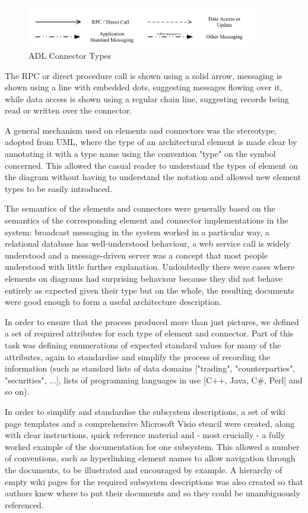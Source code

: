 \begin{figure}
\centering
\includegraphics[width=10cm]{Figures/adls-figure3}
\caption{ADL Connector Types}
\label{figure:adlconnectortypes}
\end{figure}  


  The RPC or direct procedure call is shown using a solid arrow, messaging is shown using a line with embedded dots, suggesting messages flowing over it, while data access is shown using a regular chain line, suggesting records being read or written over the connector.

  A general mechanism used on elements and connectors was the stereotype, adopted from UML, where the type of an architectural element is made clear by annotating it with a type name using the 
convention "{\guillemotleft}type{\guillemotright}" on the symbol concerned.  This allowed the casual reader to understand the types of element on the diagram without having to understand the notation and allowed new element types to be easily introduced.

  The semantics of the elements and connectors were generally based on the semantics of the corresponding element and connector implementations in the system: broadcast messaging in the system worked in a particular way, a relational database has well-understood behaviour, a web service call is widely understood and a message-driven server was a concept that most people understood with little further explanation.  Undoubtedly there were cases where elements on diagrams had surprising behaviour because they did not behave entirely as expected given their type but on the whole, the resulting documents were good enough to form a useful architecture description.

  In order to ensure that the process produced more than just pictures, we defined a set of required attributes for each type of element and connector.  Part of this task was defining enumerations of expected standard values for many of the attributes, again to standardise and simplify the process of recording the information (such as standard lists of data domains ["trading", "counterparties", "securities", ...], lists of programming languages in use [C++, Java, C\#, Perl] and so on).

  In order to simplify and standardise the subsystem descriptions, a set of wiki page templates and a comprehensive Microsoft Visio stencil were created, along with clear instructions, quick reference material and - most crucially - a fully worked example of the documentation for one subsystem.  This allowed a number of conventions, such as hyperlinking element names to allow navigation through the documents, to be illustrated and encouraged by example.  A hierarchy of empty wiki pages for the required subsystem descriptions was also created so that authors knew where to put their documents and so they could be unambiguously referenced.

